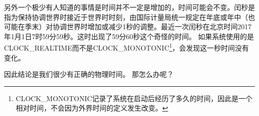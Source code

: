另外一个极少有人知道的事情是时间并不一定是增加的，时间可能会不变。闰秒是指为保持协调世界时接近于世界时时刻，由国际计量局统一规定在年底或年中（也可能在季末）对协调世界时增加或减少1秒的调整。最近一次闰秒在北京时间2017年1月1日7时59分59秒。这时出现了59分60秒这个奇怪的时间。 如果系统使用的是CLOCK\_REALTIME而不是CLOCK\_MONOTONIC\footnote{CLOCK\_MONOTONIC记录了系统在启动后经历了多久的时间，因此是一个相对时间，不会因为外界时间的定义发生改变。}，会发现这一秒时间没有变化。

因此结论是我们很少有正确的物理时间。 那怎么办呢？
